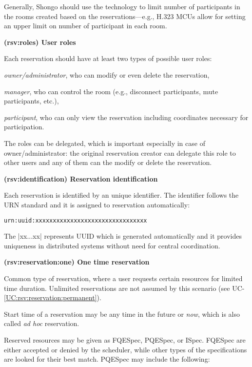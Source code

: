 \documentclass[a4paper]{report}
\makeatletter
\newcounter{UCcounter}
\newenvironment{UseCases}%
	{\begin{list}{\textbf{UC-\arabic{UCcounter}}}{\@nmbrlisttrue\def\@listctr{UCcounter}}}%
	{\end{list}}
\newcommand{\UClabel}[1]{\label{UC:#1}}
\newcommand{\UCref}[1]{UC-\ref{UC:#1}}
\newcommand{\UseCase}[2]{\item\UClabel{#2} \textbf{(#2) #1}\\ \nopagebreak}
\makeatother
\begin{document}
\begin{UseCases}
Generally, Shongo should use the technology to limit number of participants in
the rooms created based on the reservations---e.g., H.323 MCUs allow for
setting an upper limit on number of participant in each room.

\UseCase{User roles}{rsv:roles}

Each reservation should have at least two types of possible user roles:

\begin{compactitem}

\item \emph{owner/administrator}, who can modify or even delete the reservation,

\item \emph{manager}, who can control the room (e.g., disconnect participants, mute participants, etc.),

\item \emph{participant}, who can only view the reservation including coordinates necessary for participation.

\end{compactitem}

The roles can be delegated, which is important especially in case of owner/administrator: the original reservation creator can delegate this role to other users and any of them can the modify or delete the reservation.


\UseCase{Reservation identification}{rsv:identification}

Each reservation is identified by an unique identifier. The identifier follows the URN standard \cite{rfc2141} and it is assigned to reservation automatically:
\begin{verbatim}
urn:uuid:xxxxxxxxxxxxxxxxxxxxxxxxxxxxxxxx
\end{verbatim}
The |xx...xx| represents UUID \cite{rfc4122} which is generated automatically and it provides uniqueness in distributed systems without need for central coordination.


\UseCase{One time reservation}{rsv:reservation:one}

Common type of reservation, where a user requests certain resources for limited
time duration. Unlimited reservations are not assumed by this scenario (see
\UCref{rsv:reservation:permanent}).

Start time of a reservation may be any time in the future or \emph{now}, which
is also called \emph{ad hoc} reservation.

Reserved resources may be given as FQESpec, PQESpec, or ISpec. FQESpec are
either accepted or denied by the scheduler, while other types of the
specifications are looked for their best match. PQESpec may include the
following:


\end{UseCases}
\end{document}
